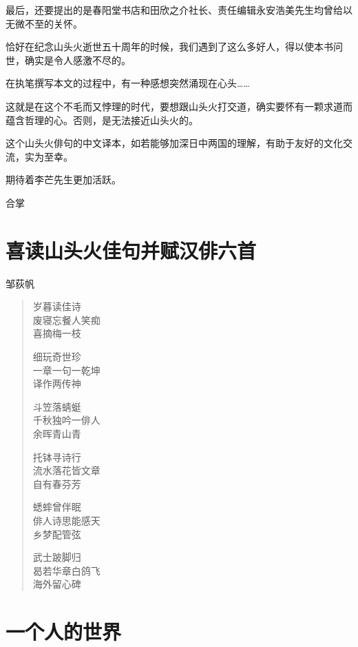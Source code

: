 {    最后，还要提出的是春阳堂书店和田欣之介社长、责任编辑永安浩美先生均曾给以无微不至的关怀。

    恰好在纪念山头火逝世五十周年的时候，我们遇到了这么多好人，得以使本书问世，确实是令人感激不尽的。

    在执笔撰写本文的过程中，有一种感想突然涌现在心头……

    这就是在这个不毛而又悖理的时代，要想跟山头火打交道，确实要怀有一颗求道而蕴含哲理的心。否则，是无法接近山头火的。

    这个山头火俳句的中文译本，如若能够加深日中两国的理解，有助于友好的文化交流，实为至幸。

    期待着李芒先生更加活跃。

    \bigskip

    \hfill 合掌
}

\chapter{\FK 喜读山头火佳句并赋汉俳六首}

{\FS \hfill 邹荻帆

    \begin{quote}
        岁暮读佳诗\\
        废寝忘餐人笑痴\\
        喜摘梅一枝

        细玩奇世珍\\
        一章一句一乾坤\\
        译作两传神

        斗笠落蜻蜓\\
        千秋独吟一俳人\\
        余晖青山青

        托钵寻诗行\\
        流水落花皆文章\\
        自有春芬芳

        蟋蟀曾伴眠\\
        俳人诗思能感天\\
        乡梦配管弦

        武士跛脚归\\
        曷若华章白鸽飞\\
        海外留心碑
    \end{quote}
}

\chapter{\FK 一个人的世界}

